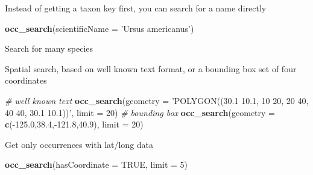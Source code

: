 \documentclass[author-year, review, 11pt]{components/elsarticle} %
\newenvironment{Shaded}{\begin{snugshade}}{\end{snugshade}}
\newcommand{\KeywordTok}[1]{\textcolor[rgb]{0.13,0.29,0.53}{\textbf{{#1}}}}
\newcommand{\DataTypeTok}[1]{\textcolor[rgb]{0.13,0.29,0.53}{{#1}}}
\newcommand{\DecValTok}[1]{\textcolor[rgb]{0.00,0.00,0.81}{{#1}}}
\newcommand{\FloatTok}[1]{\textcolor[rgb]{0.00,0.00,0.81}{{#1}}}
\newcommand{\StringTok}[1]{\textcolor[rgb]{0.31,0.60,0.02}{{#1}}}
\newcommand{\CommentTok}[1]{\textcolor[rgb]{0.56,0.35,0.01}{\textit{{#1}}}}
\newcommand{\OtherTok}[1]{\textcolor[rgb]{0.56,0.35,0.01}{{#1}}}
\newcommand{\NormalTok}[1]{{#1}}
\begin{document}
Instead of getting a taxon key first, you can search for a name directly

\begin{Shaded}
\begin{Highlighting}[]
\KeywordTok{occ_search}\NormalTok{(}\DataTypeTok{scientificName =} \StringTok{'Ursus americanus'}\NormalTok{)}
\end{Highlighting}
\end{Shaded}

Search for many species

\begin{Shaded}
\end{Shaded}

Spatial search, based on well known text format, or a bounding box set
of four coordinates

\begin{Shaded}
\begin{Highlighting}[]
\CommentTok{# well known text}
\KeywordTok{occ_search}\NormalTok{(}\DataTypeTok{geometry =} \StringTok{'POLYGON((30.1 10.1, 10 20, 20 40, 40 40, 30.1 10.1))'}\NormalTok{, }\DataTypeTok{limit =} \DecValTok{20}\NormalTok{)}
\CommentTok{# bounding box}
\KeywordTok{occ_search}\NormalTok{(}\DataTypeTok{geometry =} \KeywordTok{c}\NormalTok{(-}\FloatTok{125.0}\NormalTok{,}\FloatTok{38.4}\NormalTok{,-}\FloatTok{121.8}\NormalTok{,}\FloatTok{40.9}\NormalTok{), }\DataTypeTok{limit =} \DecValTok{20}\NormalTok{)}
\end{Highlighting}
\end{Shaded}

Get only occurrences with lat/long data

\begin{Shaded}
\begin{Highlighting}[]
\KeywordTok{occ_search}\NormalTok{(}\DataTypeTok{hasCoordinate =} \OtherTok{TRUE}\NormalTok{, }\DataTypeTok{limit =} \DecValTok{5}\NormalTok{)}
\end{Highlighting}
\end{Shaded}
\end{document}
